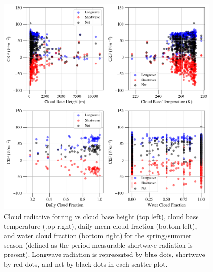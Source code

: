 \begin{figure}[p]
    \centering
    \includegraphics[width=1\linewidth]{figures/chapter4/VSSummer.png}
    \caption[Cloud radiative forcing vs cloud base height, cloud base temperature, cloud fraction, and water cloud fraction for summer.]{Cloud radiative forcing vs cloud base height (top left), cloud base temperature (top right), daily mean cloud fraction (bottom left), and water cloud fraction (bottom right) for the spring/summer season (defined as the period measurable shortwave radiation is present). Longwave radiation is represented by blue dots, shortwave by red dots, and net by black dots in each scatter plot.}
    \label{fig:spring:crf}
\end{figure}


